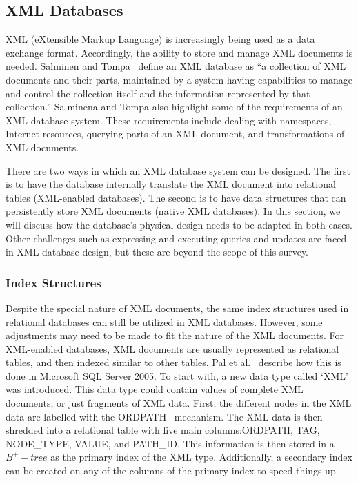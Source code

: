 \documentclass[12pt,a4paper]{article}
\begin{document}
\subsection{XML Databases}
\label{SEC-XML}

XML (eXtensible Markup Language) is increasingly being used as a data exchange format. Accordingly, the ability to store and manage XML documents is needed.
Salminen and Tompa~\cite{salminen2001requirements} define an XML database as ``a collection of XML documents and their parts, maintained by a system
having capabilities to manage and control the collection itself and the information represented by that collection.'' Salminena and Tompa also highlight some of
the requirements of an XML database system. These requirements include dealing with namespaces, Internet resources, querying parts of an XML document, and
transformations of XML documents.

There are two ways in which an XML database system can be designed. The first is to have the database internally translate the XML document into relational
tables (XML-enabled databases). The second is to have data structures that can persistently store XML documents (native XML databases). In this section, we will
discuss how the database's physical design needs to be adapted in both cases. Other challenges such as expressing and executing queries and updates are faced in
XML database design, but these are beyond the scope of this survey.



\subsubsection{Index Structures}

Despite the special nature of XML documents, the same index structures used in relational databases can still be utilized in XML databases. However, some
adjustments may need to be made to fit the nature of the XML documents. For XML-enabled databases, XML documents are usually represented as relational tables,
and then indexed similar to other tables. Pal et al.~\cite{pal2004indexing} describe how this is done in Microsoft SQL Server 2005. To start with, a new data
type called `XML' was introduced. This data type could contain values of complete XML documents, or just fragments of XML data. First, the different nodes in
the XML data are labelled with the ORDPATH~\cite{o2004ordpaths} mechanism. The XML data is then shredded into a relational table with five main columns:ORDPATH,
TAG, NODE\_TYPE, VALUE, and PATH\_ID. This information is then stored in a $B^{+}-tree$ as the primary index of the XML type. Additionally, a secondary index
can be created on any of the columns of the primary index to speed things up.
\end{document}

